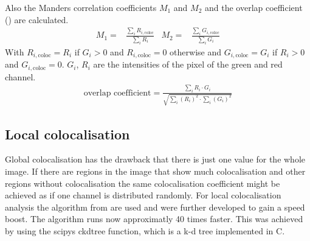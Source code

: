 Also the Manders correlation coefficients $M_1$ and $M_2$ and the overlap coefficient (\cite{manders}) are calculated.
\begin{align}
M_1 =& \frac{\sum_i R_{i,\text{coloc}}}{\sum_i R_i}&M_2 = & \frac{\sum_i G_{i,\text{coloc}}}{\sum_i G_i}
\end{align}
With $R_{i,\text{coloc}} = R_i$ if $G_i >0$ and $R_{i,\text{coloc}} = 0$ otherwise and $G_{i,\text{coloc}} = G_i$ if $R_i >0$ and $G_{i,\text{coloc}} = 0$. $G_i$, $R_i$ are the intensities of the pixel of the green and red channel.
\begin{align}
\text{overlap coefficient} = \frac{\sum_i R_i \cdot G_i}{\sqrt{\sum_i \left(R_i\right)^2 \cdot \sum_i \left(G_i\right)^2}}
\end{align}

\subsection{Local colocalisation}
Global colocalisation has the drawback that there is just one value for the whole image. If there are regions in the image that show much colocalisation and other regions without colocalisation the same colocalisation coefficient might be achieved as if one channel is distributed randomly.\newline
For local colocalisation analysis the algorithm from \cite{coloc} are used and were further developed to gain a speed boost. The algorithm runs now approximatly 40 times faster. This was achieved by using the scipys \cite{scipy} ckdtree function, which is a k-d tree implemented in C.
